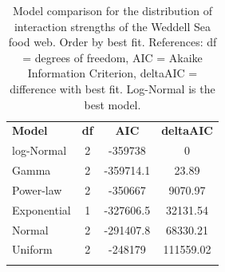 \documentclass[gc, manuscript]{copernicus}
\begin{document}
\clearpage

\begin{table}[t]
\caption{Model comparison for the distribution of interaction strengths of the Weddell Sea food web. Order by best fit. References: df = degrees of freedom, AIC = Akaike Information Criterion, deltaAIC = difference with best fit. Log-Normal is the best model.}
\begin{tabular}{l c c c}
\tophline

\textbf{Model} & \textbf{df} & \textbf{AIC} & \textbf{deltaAIC} \\
\middlehline
log-Normal & 2 & -359738 & 0 \\
\middlehline
Gamma & 2 & -359714.1 & 23.89 \\
\middlehline
Power-law & 2 & -350667 & 9070.97 \\
\middlehline
Exponential & 1 & -327606.5 & 32131.54 \\
\middlehline
Normal & 2 & -291407.8 & 68330.21 \\
\middlehline
Uniform & 2 & -248179 & 111559.02 \\

\bottomhline
\end{tabular}
\end{table}

\clearpage
\end{document}
